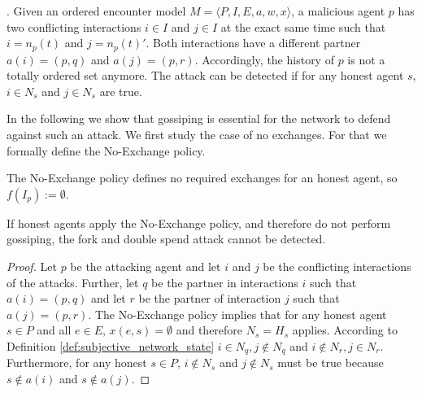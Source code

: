 \begin{defn}. Given an ordered encounter model $M = \langle P, I, E, a, w, x \rangle$, a malicious agent $p$ has two conflicting interactions 
    $i \in I$ and $j \in I$ at the exact same time such that $i = n_p(t)$ and $j = n_p(t)'$. Both interactions have a different partner $a(i) = (p, q)$ 
    and $a(j) = (p, r)$. Accordingly, the history  of $p$ is not a totally ordered set anymore.
    The attack can be detected if for any honest agent $s$, $i \in N_{s}$ and $j \in N_{s}$ are
    true.
\end{defn}

In the following we show that gossiping is essential for the network to defend against such an 
attack. We first study the case of no exchanges. For that we formally define the No-Exchange policy.

\begin{pol}[No-Exchange]
    \label{pol:no-exchange}
    The No-Exchange policy defines no required exchanges for an honest agent, so $f(I_p) := \emptyset$.
\end{pol}


\begin{thm}
    \label{thm:fork_no_gossiping}
    If honest agents apply the No-Exchange policy, and therefore do not perform gossiping,
    the fork and double spend attack cannot be detected.
\end{thm}
\begin{proof}
    Let $p$ be the attacking agent and let $i$ and $j$ be the conflicting interactions of the 
    attacks. Further, let $q$ be the partner in interactions $i$ such that $a(i) = (p, q)$ and let 
    $r$ be the partner of interaction $j$ such that $a(j) = (p, r)$. 
    The No-Exchange policy implies that for any honest agent $s \in P$ and all $e \in E$, $x(e, s) = \emptyset$ 
    and therefore $N_s = H_s$ applies. 
    According to Definition \ref{def:subjective_network_state} $i \in N_{q}, j \notin N_{q}$ and 
    $i \notin N_{r}, j \in N_{r}$. 
    Furthermore, for any honest $s \in P$, $i \notin N_s$ and $j \notin N_s$ must be true because
    $s \notin a(i)$ and $s \notin a(j)$.
\end{proof}

